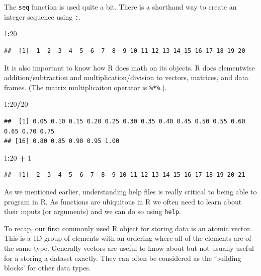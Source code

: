 \documentclass[
]{book}
\newenvironment{Shaded}{\begin{snugshade}}{\end{snugshade}}
\newcommand{\DecValTok}[1]{\textcolor[rgb]{0.00,0.00,0.81}{#1}}
\newcommand{\OperatorTok}[1]{\textcolor[rgb]{0.81,0.36,0.00}{\textbf{#1}}}
\newcommand{\StringTok}[1]{\textcolor[rgb]{0.31,0.60,0.02}{#1}}
\theoremstyle{definition}
\theoremstyle{definition}
\theoremstyle{definition}
\theoremstyle{remark}
\begin{document}
The \texttt{seq} function is used quite a bit. There is a shorthand way to create an integer sequence using \texttt{:}.

\begin{Shaded}
\begin{Highlighting}[]
\DecValTok{1}\OperatorTok{:}\DecValTok{20} 
\end{Highlighting}
\end{Shaded}

\begin{verbatim}
##  [1]  1  2  3  4  5  6  7  8  9 10 11 12 13 14 15 16 17 18 19 20
\end{verbatim}

It is also important to know how R does math on its objects. R does elementwise addition/subtraction and multiplication/division to vectors, matrices, and data frames. (The matrix multiplicaiton operator is \texttt{\%*\%}.).

\begin{Shaded}
\begin{Highlighting}[]
\DecValTok{1}\OperatorTok{:}\DecValTok{20}\OperatorTok{/}\DecValTok{20}
\end{Highlighting}
\end{Shaded}

\begin{verbatim}
##  [1] 0.05 0.10 0.15 0.20 0.25 0.30 0.35 0.40 0.45 0.50 0.55 0.60 0.65 0.70 0.75
## [16] 0.80 0.85 0.90 0.95 1.00
\end{verbatim}

\begin{Shaded}
\begin{Highlighting}[]
\DecValTok{1}\OperatorTok{:}\DecValTok{20} \OperatorTok{+}\StringTok{ }\DecValTok{1}
\end{Highlighting}
\end{Shaded}

\begin{verbatim}
##  [1]  2  3  4  5  6  7  8  9 10 11 12 13 14 15 16 17 18 19 20 21
\end{verbatim}

As we mentioned earlier, understanding help files is really critical to being able to program in R. As functions are ubiquitous in R we often need to learn about their inputs (or arguments) and we can do so using \texttt{help}.

To recap, our first commonly used R object for storing data is an atomic vector. This is a 1D group of elements with an ordering where all of the elements are of the same type. Generally vectors are useful to know about but not usually useful for a storing a dataset exactly. They can often be considered as the `building blocks' for other data types.
\end{document}
